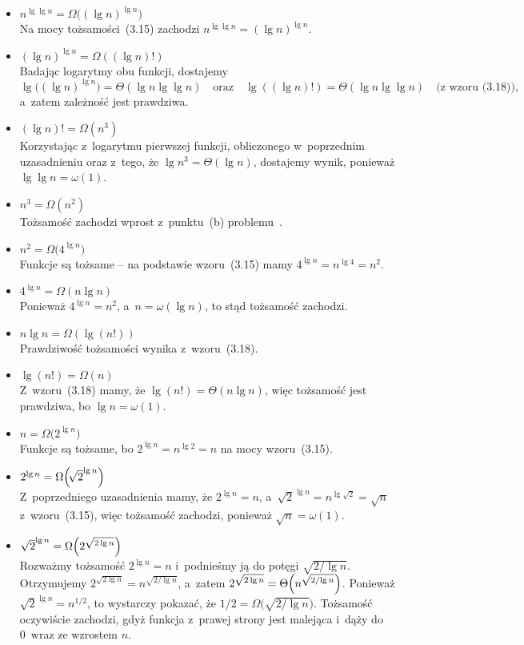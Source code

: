 \begin{itemize}
\item $n^{\lg\lg n}=\Omega\bigl((\lg n)^{\lg n}\bigr)$ \\
	Na mocy tożsamości~(3.15) zachodzi $n^{\lg\lg n}=(\lg n)^{\lg n}$.
\item $(\lg n)^{\lg n}=\Omega((\lg n)!)$ \\
	Badając logarytmy obu funkcji, dostajemy
	\[
	    \lg\bigl((\lg n)^{\lg n}\bigr) = \Theta(\lg n\lg\lg n) \quad\text{oraz}\quad \lg((\lg n)!) = \Theta(\lg n\lg\lg n) \quad\text{(z wzoru~(3.18))},
	\]
	a~zatem zależność jest prawdziwa.
\item $(\lg n)!=\Omega(n^3)$ \\
	Korzystając z~logarytmu pierwszej funkcji, obliczonego w~poprzednim uzasadnieniu oraz z~tego, że $\lg n^3=\Theta(\lg n)$, dostajemy wynik, ponieważ $\lg\lg n=\omega(1)$.
\item $n^3=\Omega(n^2)$ \\
	Tożsamość zachodzi wprost z~punktu~(b) problemu~.
\item $n^2=\Omega\bigl(4^{\lg n}\bigr)$ \\
	Funkcje są tożsame -- na podstawie wzoru~(3.15) mamy $4^{\lg n}=n^{\lg4}=n^2$.
\item $4^{\lg n}=\Omega(n\lg n)$ \\
	Ponieważ $4^{\lg n}=n^2$, a~$n=\omega(\lg n)$, to stąd tożsamość zachodzi.
\item $n\lg n=\Omega(\lg(n!))$ \\
	Prawdziwość tożsamości wynika z~wzoru~(3.18).
\item $\lg(n!)=\Omega(n)$ \\
	Z~wzoru~(3.18) mamy, że $\lg(n!)=\Theta(n\lg n)$, więc tożsamość jest prawdziwa, bo $\lg n=\omega(1)$.
\item $n=\Omega\bigl(2^{\lg n}\bigr)$ \\
	Funkcje są tożsame, bo $2^{\lg n}=n^{\lg2}=n$ na mocy wzoru~(3.15).
\item $2^{\lg n}=\Omega\Bigl(\!\sqrt{2}^{\lg n}\Bigr)$ \\
	Z~poprzedniego uzasadnienia mamy, że $2^{\lg n}=n$, a~$\sqrt{2}^{\lg n}=n^{\lg\sqrt{2}}=\sqrt{n}$ z~wzoru~(3.15), więc tożsamość zachodzi, ponieważ $\sqrt{n}=\omega(1)$.
\item $\sqrt{2}^{\lg n}=\Omega\Bigl(2^{\sqrt{2\lg n}}\Bigr)$ \\
	Rozważmy tożsamość $2^{\lg n}=n$ i~podnieśmy ją do potęgi $\sqrt{2/\!\lg n}$. Otrzymujemy $2^{\sqrt{2\lg n}}=n^{\sqrt{2/\!\lg n}}$, a~zatem $2^{\sqrt{2\lg n}}=\Theta\Bigl(n^{\sqrt{2/\!\lg n}}\Bigr)$. Ponieważ $\sqrt{2}^{\lg n}=n^{1/2}$, to wystarczy pokazać, że $1/2=\Omega\bigl(\!\sqrt{2/\!\lg n}\bigr)$. Tożsamość oczywiście zachodzi, gdyż funkcja z~prawej strony jest malejąca i~dąży do 0~wraz ze wzrostem $n$.

\end{itemize}
